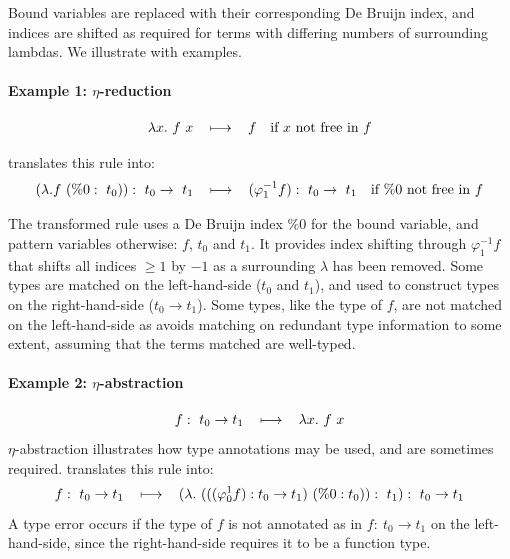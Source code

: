 Bound variables are replaced with their corresponding De Bruijn index, and indices are shifted as required for terms with differing numbers of surrounding lambdas.
We illustrate with examples.

\paragraph{Example 1:  $\eta$-reduction}

\begin{align*}
\lambda x.~f~x \quad\operatorname{\longmapsto}{}\quad& f &\text{if}~x~\text{not free in}~f
\end{align*}

\kles{} translates this rule into:
\begin{align*}
(\lambda. f~(\%0 :\ t_0)) :\ t_0 \to\ t_1 \quad\operatorname{\longmapsto}{}\quad& (\varphi^{-1}_1 f) :\ t_0 \to\ t_1 &\text{if}~\%0~\text{not free in}~f
\end{align*}

The transformed rule uses a De Bruijn index $\%0$ for the bound variable, and pattern variables otherwise: $f$, $t_0$ and $t_1$. It provides index shifting through   $\varphi^{-1}_1 f$ that shifts all indices $\ge 1$ by $-1$ as a surrounding $\lambda$ has been removed.
Some types are matched on the left-hand-side ($t_0$ and $t_1$), and used to construct types on the right-hand-side ($t_0 \to t_1$).
Some types, like the type of $f$, are not matched on the left-hand-side as \kles{} avoids matching on redundant type information to some extent, assuming that the terms matched are well-typed.

\paragraph{Example 2: $\eta$-abstraction}

\begin{equation*}
f :\ t_0 \to t_1 \quad\operatorname{\longmapsto}{}\quad \lambda x.~f~x
\end{equation*}
$\eta$-abstraction illustrates how type annotations may be used, and are sometimes required.
\kles{} translates this rule into:
\begin{equation*}
f :\ t_0 \to t_1 \quad\operatorname{\longmapsto}{}\quad (\lambda.~(((\varphi^1_0 f) : t_0 \to t_1)~(\%0 : t_0)) :\ t_1) :\ t_0 \to t_1
\end{equation*}
A type error occurs if the type of $f$ is not annotated as in $f :\ t_0 \to t_1$ on the left-hand-side, since the right-hand-side requires it to be a function type. 